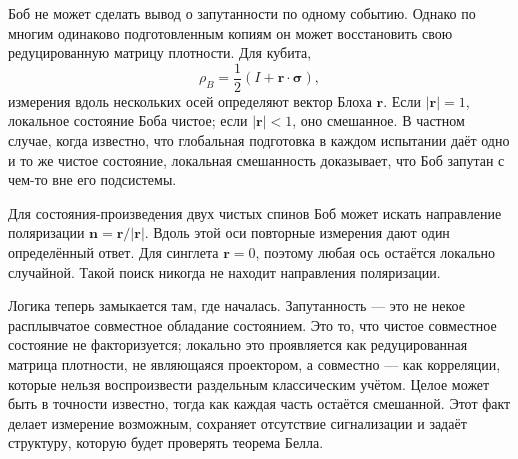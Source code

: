 Боб не может сделать вывод о запутанности по одному событию. Однако по многим одинаково подготовленным копиям он может восстановить свою редуцированную матрицу плотности. Для кубита,
\begin{equation}
\rho_B
=\frac12\left(
I+\mathbf r\cdot\boldsymbol{\sigma}
\right),
\label{eq:l7-bloch-density}
\end{equation}
измерения вдоль нескольких осей определяют вектор Блоха \(\mathbf r\). Если \(|\mathbf r|=1\), локальное состояние Боба чистое; если \(|\mathbf r|<1\), оно смешанное. В частном случае, когда известно, что глобальная подготовка в каждом испытании даёт одно и то же чистое состояние, локальная смешанность доказывает, что Боб запутан с чем-то вне его подсистемы.

Для состояния-произведения двух чистых спинов Боб может искать направление поляризации \(\mathbf n=\mathbf r/|\mathbf r|\). Вдоль этой оси повторные измерения дают один определённый ответ. Для синглета \(\mathbf r=0\), поэтому любая ось остаётся локально случайной. Такой поиск никогда не находит направления поляризации.

\begin{classroomqa}
\end{classroomqa}

\begin{classroomqa}
\end{classroomqa}

Логика теперь замыкается там, где началась. Запутанность — это не некое расплывчатое совместное обладание состоянием. Это то, что чистое совместное состояние не факторизуется; локально это проявляется как редуцированная матрица плотности, не являющаяся проектором, а совместно — как корреляции, которые нельзя воспроизвести раздельным классическим учётом. Целое может быть в точности известно, тогда как каждая часть остаётся смешанной. Этот факт делает измерение возможным, сохраняет отсутствие сигнализации и задаёт структуру, которую будет проверять теорема Белла.
